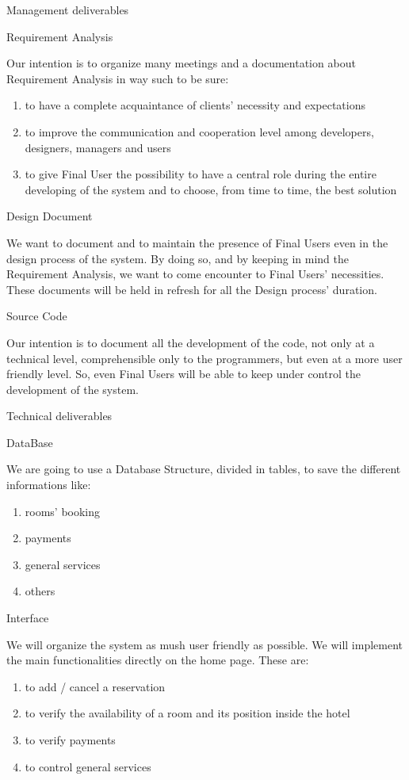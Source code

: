 Management deliverables

Requirement Analysis 
	
	Our intention is to organize many meetings and a documentation about Requirement Analysis in way such to be sure:
\begin{enumerate}
	\item to have a complete acquaintance of clients’ necessity and expectations
	\item to improve the communication and cooperation level among developers,
	  designers, managers and users
	\item to give Final User the possibility to have a central role during the entire 
	  developing of the system and to choose, from time to time, the best solution
\end{enumerate}

Design Document
	
	We want to document and to maintain the presence of Final Users even in the design process of the system. By doing so, and by keeping in mind the Requirement Analysis, we want to come encounter to Final Users’ necessities. 
	These documents will be held in refresh for all the Design process’ duration.


Source Code
		
	Our intention is to document all the development of the code, not only at a technical level, comprehensible only to the programmers, but even at a more user friendly level. So, even Final Users will be able to keep under control the development of the system.

	








Technical deliverables

DataBase 
		
	We are going to use a Database Structure, divided in tables, to save the different informations like:
\begin{enumerate}
	\item rooms’ booking 
	\item payments
	\item general services 
	\item others
\end{enumerate}

Interface  
	
	We will organize the system as mush user friendly as possible. We will implement the main functionalities directly on the home page. These are:
\begin{enumerate}
	\item to add / cancel a reservation
	\item to verify the availability of a room and its position inside the hotel
	\item to verify payments
	\item to control general services
\end{enumerate}

